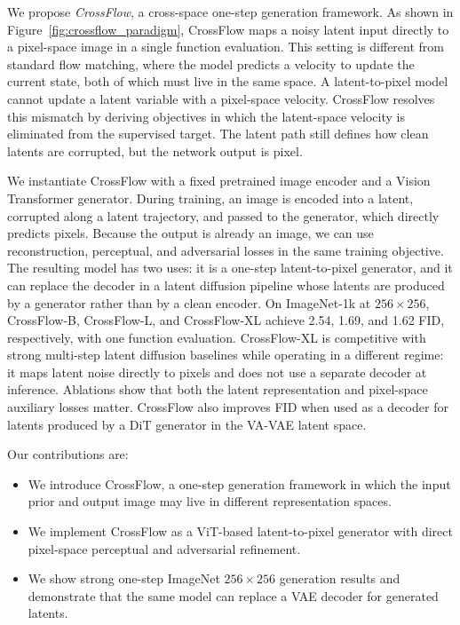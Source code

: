 We propose \emph{CrossFlow}, a cross-space one-step generation framework. As shown in Figure~\ref{fig:crossflow_paradigm}, CrossFlow maps a noisy latent input directly to a pixel-space image in a single function evaluation. This setting is different from standard flow matching, where the model predicts a velocity to update the current state, both of which must live in the same space. A latent-to-pixel model cannot update a latent variable with a pixel-space velocity. CrossFlow resolves this mismatch by deriving objectives in which the latent-space velocity is eliminated from the supervised target. The latent path still defines how clean latents are corrupted, but the network output is pixel.


We instantiate CrossFlow with a fixed pretrained image encoder and a Vision Transformer generator. During training, an image is encoded into a latent, corrupted along a latent trajectory, and passed to the generator, which directly predicts pixels. Because the output is already an image, we can use reconstruction, perceptual, and adversarial losses in the same training objective. The resulting model has two uses: it is a one-step latent-to-pixel generator, and it can replace the decoder in a latent diffusion pipeline whose latents are produced by a generator rather than by a clean encoder. On ImageNet-1k at $256\times256$, CrossFlow-B, CrossFlow-L, and CrossFlow-XL achieve 2.54, 1.69, and 1.62 FID, respectively, with one function evaluation. CrossFlow-XL is competitive with strong multi-step latent diffusion baselines while operating in a different regime: it maps latent noise directly to pixels and does not use a separate decoder at inference. Ablations show that both the latent representation and pixel-space auxiliary losses matter. CrossFlow also improves FID when used as a decoder for latents produced by a DiT generator in the VA-VAE latent space.

Our contributions are:
\begin{itemize}
    \item We introduce CrossFlow, a one-step generation framework in which the input prior and output image may live in different representation spaces.
    \item We implement CrossFlow as a ViT-based latent-to-pixel generator with direct pixel-space perceptual and adversarial refinement.
    \item We show strong one-step ImageNet $256\times256$ generation results and demonstrate that the same model can replace a VAE decoder for generated latents.
\end{itemize}

